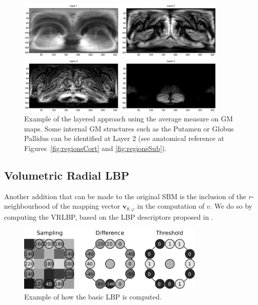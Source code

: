 \begin{figure}[htp]
	\centering
	\includegraphics[width=0.9\textwidth]{Graphics/ch6/layeredAverageGM}
	\caption[Example of the layered approach using the average measure on \acs{GM} maps.]{Example of the layered approach using the average measure on \ac{GM} maps. Some internal \ac{GM} structures such as the Putamen or Globus Pallidus can be identified at Layer 2 (see anatomical reference at Figures~\ref{fig:regionsCort} and \ref{fig:regionsSub}).}
	\label{fig:layeredGM}
\end{figure}

\subsection{Volumetric Radial LBP}\label{sec:vrlbp}
Another addition that can be made to the original \ac{SBM} is the inclusion of the $r$-neighbourhood of the mapping vector $\mathbf{v}_{\theta,\varphi}$ in the computation of $v$. We do so by computing the \acf{VRLBP}, based on the \ac{LBP} descriptors proposed in \cite{Ojala1996}. 

\begin{figure}[htp]
	\centering
	\includegraphics[width=0.8\textwidth]{Graphics/ch6/lbpLinear}
	\caption{Example of how the basic \acs{LBP} is computed.}
	\label{fig:lbpBasic}
\end{figure}

